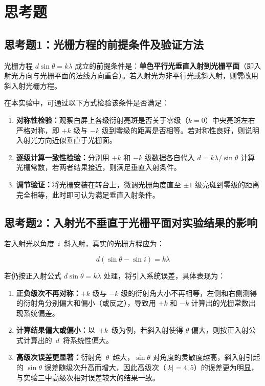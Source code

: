 \documentclass[12pt, a4paper]{article}
\begin{document}
\section{思考题}

\subsection*{思考题1：光栅方程的前提条件及验证方法}

光栅方程 $d\sin\theta = k\lambda$ 成立的前提条件是：\textbf{单色平行光垂直入射到光栅平面}（即入射光方向与光栅平面的法线方向重合）。若入射光为非平行光或斜入射，则需改用斜入射光栅方程。

在本实验中，可通过以下方式检验该条件是否满足：

\begin{enumerate}
  \item \textbf{对称性检验：}观察白屏上各级衍射亮斑是否关于零级（$k=0$）中央亮斑左右严格对称，即 $+k$ 级与 $-k$ 级到零级的距离是否相等。若对称性良好，则说明入射光方向近似垂直于光栅面。
  \item \textbf{逐级计算一致性检验：}分别用 $+k$ 和 $-k$ 级数据各自代入 $d = k\lambda/\sin\theta$ 计算光栅常数，若两者结果接近，则满足垂直入射条件。
  \item \textbf{调节验证：}将光栅安装在转台上，微调光栅角度直至 $\pm1$ 级亮斑到零级的距离完全相等，此时即可认为满足垂直入射条件。
\end{enumerate}

\subsection*{思考题2：入射光不垂直于光栅平面对实验结果的影响}

若入射光以角度~$i$~斜入射，真实的光栅方程应为：

\begin{equation}
  d(\sin\theta - \sin i) = k\lambda
\end{equation}

若仍按正入射公式 $d\sin\theta = k\lambda$ 处理，将引入系统误差，具体表现为：

\begin{enumerate}
  \item \textbf{正负级次不再对称：}$+k$ 级与 $-k$ 级的衍射角大小不再相等，左侧和右侧测得的衍射角分别偏大和偏小（或反之），导致用 $+k$ 和 $-k$ 计算出的光栅常数出现系统偏差。
  \item \textbf{计算结果偏大或偏小：}以~$+k$~级为例，若斜入射使得 $\theta$ 偏大，则按正入射公式计算出的~$d$~将系统性偏大。
  \item \textbf{高级次误差更显著：}衍射角~$\theta$~越大，$\sin\theta$ 对角度的灵敏度越高，斜入射引起的 $\sin\theta$ 误差随级次升高而增大，因此高级次（$|k|=4,5$）的误差更为明显，与实验三中高级次相对误差较大的结果一致。
\end{enumerate}
\end{document}
